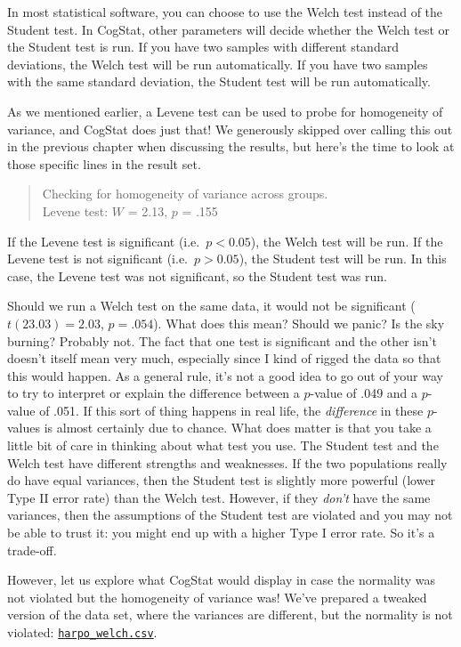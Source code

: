 \documentclass[
]{book}
\theoremstyle{definition}
\theoremstyle{definition}
\theoremstyle{definition}
\theoremstyle{definition}
\theoremstyle{remark}
\begin{document}
In most statistical software, you can choose to use the Welch test instead of the Student test. In CogStat, other parameters will decide whether the Welch test or the Student test is run. If you have two samples with different standard deviations, the Welch test will be run automatically. If you have two samples with the same standard deviation, the Student test will be run automatically.

As we mentioned earlier, a Levene test can be used to probe for homogeneity of variance, and CogStat does just that! We generously skipped over calling this out in the previous chapter when discussing the results, but here's the time to look at those specific lines in the result set.

\begin{quote}
Checking for homogeneity of variance across groups.\\
Levene test: \(W\) = 2.13, \(p\) = .155
\end{quote}

If the Levene test is significant (i.e.~\(p < 0.05\)), the Welch test will be run. If the Levene test is not significant (i.e.~\(p > 0.05\)), the Student test will be run. In this case, the Levene test was not significant, so the Student test was run.

Should we run a Welch test on the same data, it would not be significant (\(t(23.03) = 2.03\), \(p = .054\)). What does this mean? Should we panic? Is the sky burning? Probably not. The fact that one test is significant and the other isn't doesn't itself mean very much, especially since I kind of rigged the data so that this would happen. As a general rule, it's not a good idea to go out of your way to try to interpret or explain the difference between a \(p\)-value of .049 and a \(p\)-value of .051. If this sort of thing happens in real life, the \emph{difference} in these \(p\)-values is almost certainly due to chance. What does matter is that you take a little bit of care in thinking about what test you use. The Student test and the Welch test have different strengths and weaknesses. If the two populations really do have equal variances, then the Student test is slightly more powerful (lower Type II error rate) than the Welch test. However, if they \emph{don't} have the same variances, then the assumptions of the Student test are violated and you may not be able to trust it: you might end up with a higher Type I error rate. So it's a trade-off.

However, let us explore what CogStat would display in case the normality was not violated but the homogeneity of variance was! We've prepared a tweaked version of the data set, where the variances are different, but the normality is not violated: \href{resources/data/harpo_welch.csv}{\texttt{harpo\_welch.csv}}.
\end{document}
